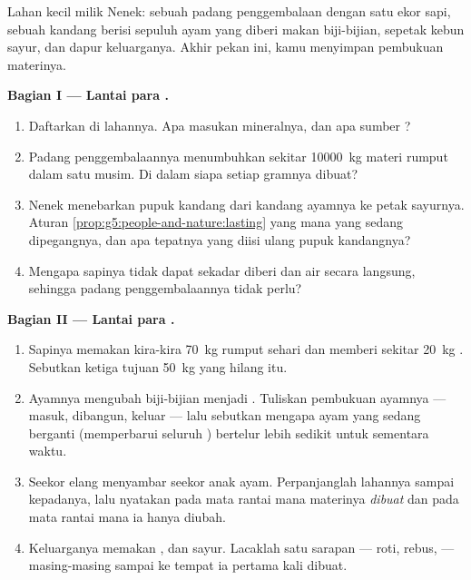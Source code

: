 \begin{problem}\label{pb:g6:matter-from-food:1}
Lahan kecil milik Nenek: sebuah padang penggembalaan dengan satu ekor
sapi, sebuah kandang berisi sepuluh ayam yang diberi makan biji-bijian,
sepetak kebun sayur, dan dapur keluarganya. Akhir pekan ini, kamu
menyimpan pembukuan materinya.

\medskip\noindent\textbf{Bagian I --- Lantai para .}
\begin{enumerate}
  \item Daftarkan  di lahannya. Apa masukan mineralnya, dan
        apa sumber ?
  \item Padang penggembalaannya menumbuhkan sekitar \qty{10000}{kg}
        materi rumput dalam satu musim. Di dalam  siapa setiap
        gramnya dibuat?
  \item Nenek menebarkan pupuk kandang dari kandang ayamnya ke petak
        sayurnya. Aturan \cref{prop:g5:people-and-nature:lasting} yang
        mana yang sedang dipegangnya, dan apa tepatnya yang diisi
        ulang pupuk kandangnya?
  \item Mengapa sapinya tidak dapat sekadar diberi  dan
        air secara langsung, sehingga padang penggembalaannya tidak
        perlu?
\end{enumerate}

\medskip\noindent\textbf{Bagian II --- Lantai para .}
\begin{enumerate}[resume]
  \item Sapinya memakan kira-kira \qty{70}{kg} rumput sehari dan
        memberi sekitar \qty{20}{kg} . Sebutkan ketiga tujuan
        \qty{50}{kg} yang hilang itu.
  \item Ayamnya mengubah biji-bijian menjadi . Tuliskan pembukuan
        ayamnya --- masuk, dibangun, keluar --- lalu sebutkan mengapa
        ayam yang sedang berganti  (memperbarui seluruh )
        bertelur lebih sedikit untuk sementara waktu.
  \item Seekor elang menyambar seekor anak ayam. Perpanjanglah  lahannya sampai kepadanya, lalu nyatakan pada mata
        rantai mana materinya \emph{dibuat} dan pada mata rantai mana
        ia hanya diubah.
  \item Keluarganya memakan ,  dan sayur. Lacaklah  satu sarapan --- roti,  rebus,  ---
        masing-masing sampai ke  tempat ia pertama kali dibuat.
\end{enumerate}


\end{problem}
